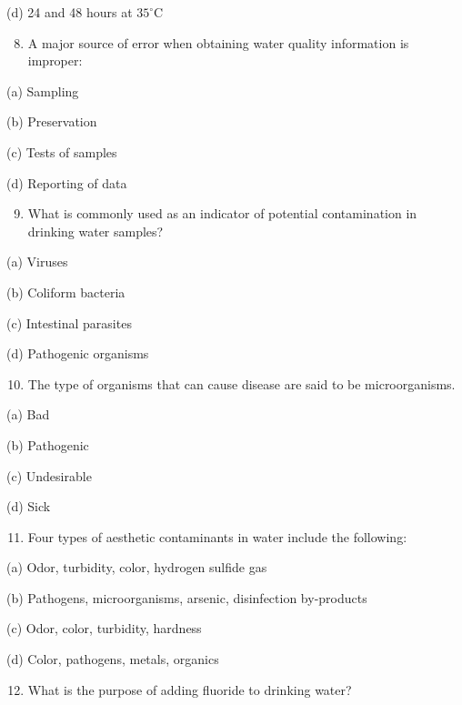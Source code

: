 \documentclass[10pt]{article}
\begin{document}
(d) 24 and 48 hours at $35^{\circ} \mathrm{C}$

\begin{enumerate}
  \setcounter{enumi}{7}
  \item A major source of error when obtaining water quality information is improper:
\end{enumerate}

(a) Sampling

(b) Preservation

(c) Tests of samples

(d) Reporting of data

\begin{enumerate}
  \setcounter{enumi}{8}
  \item What is commonly used as an indicator of potential contamination in drinking water samples?
\end{enumerate}

(a) Viruses

(b) Coliform bacteria

(c) Intestinal parasites

(d) Pathogenic organisms

\begin{enumerate}
  \setcounter{enumi}{9}
  \item The type of organisms that can cause disease are said to be microorganisms.
\end{enumerate}

(a) Bad

(b) Pathogenic

(c) Undesirable

(d) Sick

\begin{enumerate}
  \setcounter{enumi}{10}
  \item Four types of aesthetic contaminants in water include the following:
\end{enumerate}

(a) Odor, turbidity, color, hydrogen sulfide gas

(b) Pathogens, microorganisms, arsenic, disinfection by-products

(c) Odor, color, turbidity, hardness

(d) Color, pathogens, metals, organics

\begin{enumerate}
  \setcounter{enumi}{11}
  \item What is the purpose of adding fluoride to drinking water?
\end{enumerate}
\end{document}
